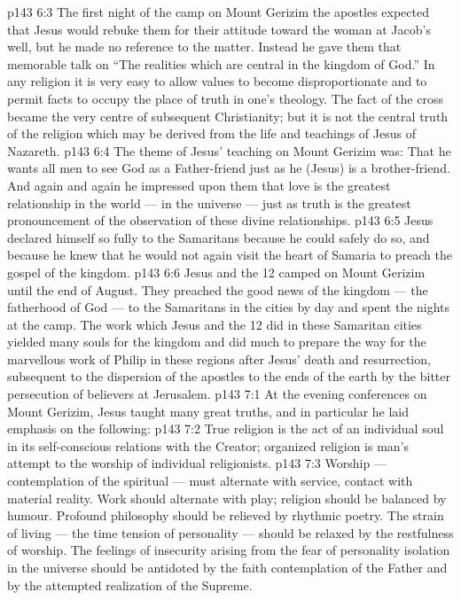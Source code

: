 \vs p143 6:3 \pc The first night of the camp on Mount Gerizim the apostles expected that Jesus would rebuke them for their attitude toward the woman at Jacob’s well, but he made no reference to the matter. Instead he gave them that memorable talk on “The realities which are central in the kingdom of God.” In any religion it is very easy to allow values to become disproportionate and to permit facts to occupy the place of truth in one’s theology. The fact of the cross became the very centre of subsequent Christianity; but it is not the central truth of the religion which may be derived from the life and teachings of Jesus of Nazareth.
\vs p143 6:4 The theme of Jesus’ teaching on Mount Gerizim was: That he wants all men to see God as a Father\hyp{}friend just as he (Jesus) is a brother\hyp{}friend. And again and again he impressed upon them that love is the greatest relationship in the world --- in the universe --- just as truth is the greatest pronouncement of the observation of these divine relationships.
\vs p143 6:5 Jesus declared himself so fully to the Samaritans because he could safely do so, and because he knew that he would not again visit the heart of Samaria to preach the gospel of the kingdom.
\vs p143 6:6 Jesus and the 12 camped on Mount Gerizim until the end of August. They preached the good news of the kingdom --- the fatherhood of God --- to the Samaritans in the cities by day and spent the nights at the camp. The work which Jesus and the 12 did in these Samaritan cities yielded many souls for the kingdom and did much to prepare the way for the marvellous work of Philip in these regions after Jesus’ death and resurrection, subsequent to the dispersion of the apostles to the ends of the earth by the bitter persecution of believers at Jerusalem.
\vs p143 7:1 At the evening conferences on Mount Gerizim, Jesus taught many great truths, and in particular he laid emphasis on the following:
\vs p143 7:2 \pc True religion is the act of an individual soul in its self\hyp{}conscious relations with the Creator; organized religion is man’s attempt to  the worship of individual religionists.
\vs p143 7:3 \pc Worship --- contemplation of the spiritual --- must alternate with service, contact with material reality. Work should alternate with play; religion should be balanced by humour. Profound philosophy should be relieved by rhythmic poetry. The strain of living --- the time tension of personality --- should be relaxed by the restfulness of worship. The feelings of insecurity arising from the fear of personality isolation in the universe should be antidoted by the faith contemplation of the Father and by the attempted realization of the Supreme.
